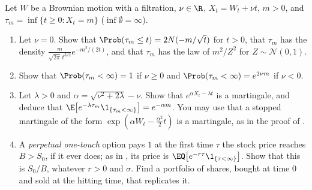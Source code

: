 \begin{exercise}\label{ex:exo-hitting}
\medium Let $W$ be a Brownian motion with a filtration, $\nu\in\R$, $X_t=W_t+\nu t$, $m>0$, and
$\tau_m=\inf\{t\ge0:X_t=m\}$ ($\inf\emptyset=\infty$).
\begin{enumerate}[label=(\alph*)]
  \item Let $\nu=0$. Show that $\Prob(\tau_m\le t)=2N(-m/\sqrt t)$ for $t>0$, that $\tau_m$ has the
    density $\frac{m}{\sqrt{2\pi}\,t^{3/2}}e^{-m^2/(2t)}$, and that $\tau_m$ has the law of $m^2/Z^2$
    for $Z\sim\mathcal N(0,1)$.
  \item Show that $\Prob(\tau_m<\infty)=1$ if $\nu\ge0$ and $\Prob(\tau_m<\infty)=e^{2\nu m}$ if $\nu<0$.
  \item Let $\lambda>0$ and $\alpha=\sqrt{\nu^2+2\lambda}-\nu$. Show that $e^{\alpha X_t-\lambda t}$ is a
    martingale, and deduce that $\E\big[e^{-\lambda\tau_m}\1_{\{\tau_m<\infty\}}\big]=e^{-\alpha m}$.
    You may use that a stopped martingale of the form $\exp(\alpha W_t-\frac{\alpha^2}2t)$ is a
    martingale, as in the proof of .
  \item A \emph{perpetual one-touch} option pays $1$ at the first time $\tau$ the stock price reaches
    $B>S_0$, if it ever does; as in , its price is
    $\EQ\big[e^{-r\tau}\1_{\{\tau<\infty\}}\big]$. Show that this is $S_0/B$, whatever $r>0$ and $\sigma$. Find a
    portfolio of shares, bought at time $0$ and sold at the hitting time, that replicates it.
\end{enumerate}
\end{exercise}

